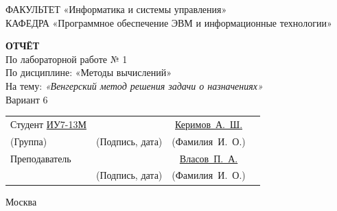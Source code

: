 \begin{titlepage}
	{\doublespacing\small\raggedright
		ФАКУЛЬТЕТ \hspace{28mm} «Информатика и системы управления» \\
		КАФЕДРА \hspace{9mm} «Программное обеспечение ЭВМ и информационные технологии» \\
	}

	\vspace{20mm}

	{\large\bfseries ОТЧЁТ} \\
	По лабораторной работе № 1 \\
	По дисциплине: «Методы вычислений» \\
	На тему: {\itshape «Венгерский метод решения задачи о назначениях»} \\
	Вариант 6

	\vfill

	\begin{tabular}{p{} c c c}
		Студент \underline{ИУ7-13М}            & \underline{\hspace{35mm}}     & \underline{Керимов~А.~Ш.}     \\ [-0.6em]
		{\hspace{23.5mm} \scriptsize (Группа)} & {\scriptsize (Подпись, дата)} & {\scriptsize (Фамилия~И.~О.)} \\
		Преподаватель                          & \underline{\hspace{35mm}}     & \underline{Власов~П.~А.}      \\ [-0.6em]
		                                       & {\scriptsize (Подпись, дата)} & {\scriptsize (Фамилия~И.~О.)} \\
	\end{tabular}

	\vspace{15mm}

	Москва {\the\year}
\end{titlepage}

\setcounter{page}{2}
